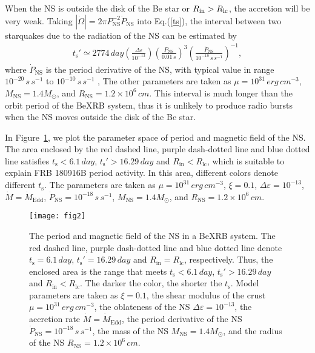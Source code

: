 \documentclass[twocolumn]{aastex62}
\begin{document}
When the NS is outside the disk of the Be star or $ R_{\rm in} > R_{\rm lc}$, the accretion will be very weak. 
Taking $|\dot{\Omega}|= 2 \pi P_{\text{NS}}^{-2}\dot{P}_{\text{NS}}$ into Eq.(\ref{ts}), the interval between two starquakes due to the radiation of the NS can be estimated by
\begin{align}
t_{\text{s}}' \simeq 2774  \,\unit{day}  \left(\frac{\Delta \varepsilon}{10^{-13}}\right) \left( \frac{P_{\text{NS}}}{0.01\,\unit{s}}\right)^3 \left(\frac{\dot{P}_\text{NS}}{10^{-18}\,\unit{s\,s^{-1}}}\right)^{-1} ,\label{waittime2}
\end{align}
where $\dot{P}_{\text{NS}}$ is the period derivative of the NS, with typical value in range $10^{-20}\,\unit{s\,s^{-1}}$ to $10^{-10}\,\unit{s\,s^{-1}}$ \citep{tay93},
The other parameters are taken as $\mu = 10^{31}  \,\unit{erg\,cm^{-3}}$, $M_{\text{NS}} = 1.4M_{\odot}$, and $R_{\text{NS}} = 1.2\times 10^6\,\unit{cm}$.
This interval is much longer than the orbit period of the BeXRB system, thus it is unlikely to produce radio bursts when the NS moves outside the disk of the Be star.

In Figure~\ref{P-B}, we plot the parameter space of period and magnetic field of the NS. The area enclosed by the red dashed line, purple dash-dotted line and blue dotted line satisfies $t_{\text{s}} < 6.1\,\unit{day}$, $t_{\text{s}}' > 16.29\,\unit{day}$ and $R_{\mathrm{in}} < R_{\mathrm{lc}}$, which is suitable to explain FRB 180916B period activity.
In this area, different colors denote different $t_{\text{s}}$. The parameters are taken as $\mu = 10^{31}  \,\unit{erg\,cm^{-3}}$, $\xi = 0.1$, $\Delta \varepsilon = 10^{-13}$,  $\dot{M} = \dot{M}_{\text{Edd}}$, $\dot{P}_\text{NS} = 10^{-18}\,\unit{s\,s^{-1}}$, $M_{\text{NS}} = 1.4M_{\odot}$, and $R_{\text{NS}} = 1.2\times 10^6\,\unit{cm}$.

\begin{figure}[htbp]
\centering
\texttt{[image: fig2]}
\caption{The period and magnetic field of the NS in a BeXRB system. The red dashed line, purple dash-dotted line and blue dotted line denote $t_{\text{s}} = 6.1\,\unit{day}$, $t_{\text{s}}' = 16.29\,\unit{day}$ and $R_{\mathrm{in}} = R_{\mathrm{lc}}$, respectively.
Thus, the enclosed area is the range that meets $t_{\text{s}} < 6.1\,\unit{day}$, $t_{\text{s}}' > 16.29\,\unit{day}$ and $R_{\mathrm{in}} < R_{\mathrm{lc}}$.
The darker the color, the shorter the $t_{\text{s}}$.
Model parameters are taken as $\xi = 0.1$, the shear modulus of the crust $\mu = 10^{31}  \,\unit{erg\,cm^{-3}}$, the oblateness of the NS $\Delta \varepsilon = 10^{-13}$,  the accretion rate $\dot{M} = \dot{M}_{\text{Edd}}$, the period derivative of the NS $\dot{P}_\text{NS} = 10^{-18}\,\unit{s\,s^{-1}}$, the mass of the NS $M_{\text{NS}} = 1.4M_{\odot}$, and the radius of the NS $R_{\text{NS}} = 1.2\times 10^6\,\unit{cm}$.}
\label{P-B}
\end{figure}
\end{document}

